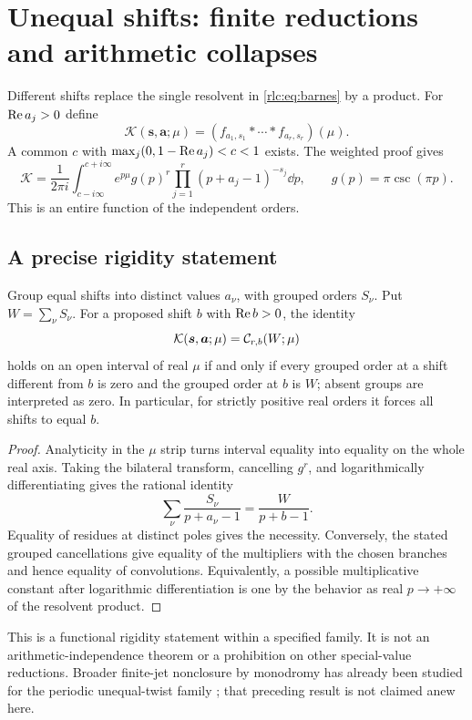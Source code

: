 \section{Unequal shifts: finite reductions and arithmetic collapses}
\label{rlc:sec:unequal}

Different shifts replace the single resolvent in
\eqref{rlc:eq:barnes} by a product. For $\operatorname{Re} a_j>0$ define
\[
 \mathcal K(\boldsymbol s,\boldsymbol a;\mu)
       =(f_{a_1,s_1}*\cdots*f_{a_r,s_r})(\mu).
\]
A common $c$ with
$\max_j(0,1-\operatorname{Re} a_j)<c<1$ exists. The weighted proof gives
\begin{equation}\label{rlc:eq:unequaltransform}
 \mathcal K=\frac1{2\pi i}\int_{c-i\infty}^{c+i\infty}
       e^{p\mu}g(p)^r\prod_{j=1}^r(p+a_j-1)^{-s_j}\dd p,
 \qquad g(p)=\pi\csc(\pi p).
\end{equation}
This is an entire function of the independent orders.

\subsection{A precise rigidity statement}
\begin{proposition}
\label{rlc:prop:rigidity}
Group equal shifts into distinct values $a_\nu$, with grouped orders
$S_\nu$. Put $W=\sum_\nu S_\nu$. For a proposed shift $b$ with
$\operatorname{Re} b>0$, the identity
\[
 \mathcal K(\boldsymbol s,\boldsymbol a;\mu)=\mathcal C_{r,b}(W;\mu)
\]
holds on an open interval of real $\mu$ if and only if every grouped
order at a shift different from $b$ is zero and the grouped order at
$b$ is $W$; absent groups are interpreted as zero. In particular, for
strictly positive real orders it forces all shifts to equal $b$.
\end{proposition}
\begin{proof}
Analyticity in the $\mu$ strip turns interval equality into equality on
the whole real axis. Taking the bilateral transform, cancelling $g^r$,
and logarithmically differentiating gives the rational identity
\[
 \sum_\nu\frac{S_\nu}{p+a_\nu-1}=\frac{W}{p+b-1}.
\]
Equality of residues at distinct poles gives the necessity. Conversely,
the stated grouped cancellations give equality of the multipliers with
the chosen branches and hence equality of convolutions. Equivalently,
a possible multiplicative constant after logarithmic differentiation is
one by the behavior as real $p\to+\infty$ of the resolvent product.
\end{proof}

This is a functional rigidity statement within a specified family.
It is not an arithmetic-independence theorem or a prohibition on other
special-value reductions. Broader finite-jet nonclosure by monodromy
has already been studied for the periodic unequal-twist family
\cite{UTJ}; that preceding result is not claimed anew here.


